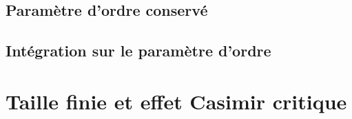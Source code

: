     \subsection{Paramètre d'ordre conservé}
	
    
    \subsection{Intégration sur le paramètre d'ordre}



    \section{Taille finie et effet Casimir critique}
    \label{sec-casimir}

